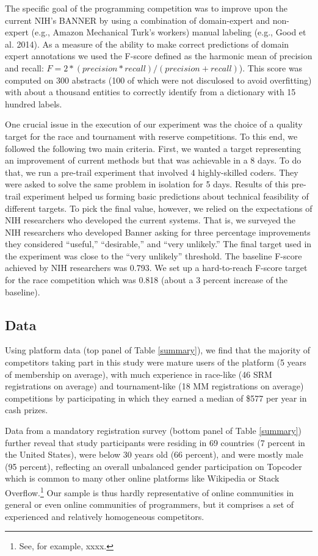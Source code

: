 \documentclass[11pt, titlepage]{article}
\begin{document}
The specific goal of the programming competition was to improve upon the
current NIH's BANNER by using a combination of domain-expert and
non-expert (e.g., Amazon Mechanical Turk's workers) manual labeling
(e.g., Good et al. 2014). As a measure of the ability to make correct
predictions of domain expert annotations we used the F-score defined as
the harmonic mean of precision and recall:
\(F = 2 * (precision * recall) / (precision + recall)\)). This score was
computed on 300 abstracts (100 of which were not disculosed to avoid
overfitting) with about a thousand entities to correctly identify from a
dictionary with 15 hundred labels.

One crucial issue in the execution of our experiment was the choice of a
quality target for the race and tournament with reserve competitions. To
this end, we followed the following two main criteria. First, we wanted
a target representing an improvement of current methods but that was
achievable in a 8 days. To do that, we run a pre-trail experiment that
involved 4 highly-skilled coders. They were asked to solve the same
problem in isolation for 5 days. Results of this pre-trail experiment
helped us forming basic predictions about technical feasibility of
different targets. To pick the final value, however, we relied on the
expectations of NIH researchers who developed the current systems. That
is, we surveyed the NIH researchers who developed Banner asking for
three percentage improvements they considered ``useful,'' ``desirable,''
and ``very unlikely.'' The final target used in the experiment was close
to the ``very unlikely'' threshold. The baseline F-score achieved by NIH
researchers was 0.793. We set up a hard-to-reach F-score target for the
race competition which was 0.818 (about a 3 percent increase of the
baseline).

\subsection{Data}\label{data}

Using platform data (top panel of Table \ref{summary}), we find that the
majority of competitors taking part in this study were mature users of
the platform (5 years of membership on average), with much experience in
race-like (46 SRM registrations on average) and tournament-like (18 MM
registrations on average) competitions by participating in which they
earned a median of \$577 per year in cash prizes.

Data from a mandatory registration survey (bottom panel of Table
\ref{summary}) further reveal that study participants were residing in
69 countries (7 percent in the United States), were below 30 years old
(66 percent), and were mostly male (95 percent), reflecting an overall
unbalanced gender participation on Topcoder which is common to many
other online platforms like Wikipedia or Stack Overflow.\footnote{See,
  for example, xxxx.} Our sample is thus hardly representative of online
communities in general or even online communities of programmers, but it
comprises a set of experienced and relatively homogeneous competitors.
\end{document}
